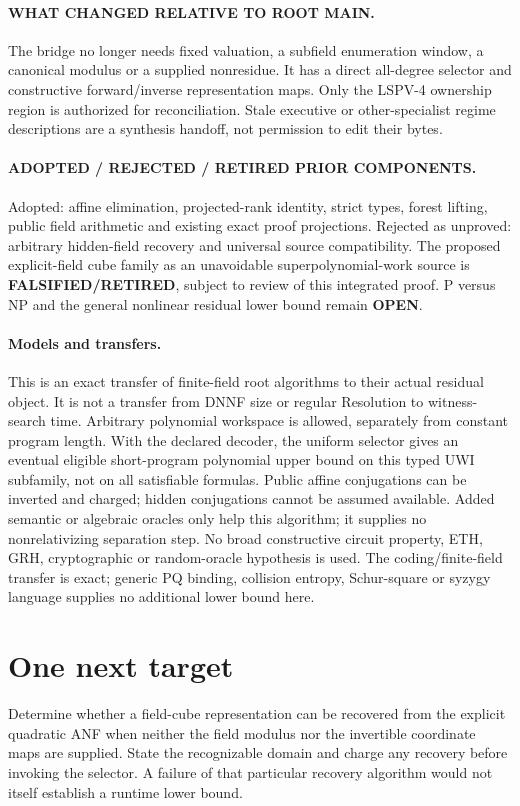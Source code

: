 \documentclass[11pt]{article}
\begin{document}
\paragraph{WHAT CHANGED RELATIVE TO ROOT MAIN.}
The bridge no longer needs fixed valuation, a subfield enumeration window,
a canonical modulus or a supplied nonresidue. It has a direct all-degree
selector and constructive forward/inverse representation maps. Only the
LSPV-4 ownership region is authorized for reconciliation. Stale executive or
other-specialist regime descriptions are a synthesis handoff, not permission
to edit their bytes.

\paragraph{ADOPTED / REJECTED / RETIRED PRIOR COMPONENTS.}
Adopted: affine elimination, projected-rank identity, strict types, forest
lifting, public field arithmetic and existing exact proof projections.
Rejected as unproved: arbitrary hidden-field recovery and universal source
compatibility. The proposed explicit-field cube family as an unavoidable
superpolynomial-work source is \textbf{FALSIFIED/RETIRED}, subject to review
of this integrated proof. P versus NP and the general nonlinear residual
lower bound remain \textbf{OPEN}.

\paragraph{Models and transfers.}
This is an exact transfer of finite-field root algorithms to their actual
residual object. It is not a transfer from DNNF size or regular Resolution
\cite{colnet} to witness-search time. Arbitrary polynomial workspace is
allowed, separately from constant program length. With the declared decoder,
the uniform selector gives an eventual eligible short-program polynomial
upper bound on this typed UWI subfamily, not on all satisfiable formulas.
Public affine conjugations can be inverted and charged; hidden conjugations
cannot be assumed available. Added semantic or algebraic oracles only help
this algorithm; it supplies no nonrelativizing separation step. No broad
constructive circuit property, ETH, GRH, cryptographic or random-oracle
hypothesis is used. The coding/finite-field transfer is exact; generic PQ
binding, collision entropy, Schur-square or syzygy language supplies no
additional lower bound here.

\section{One next target}
Determine whether a field-cube representation can be recovered from the
explicit quadratic ANF when neither the field modulus nor the invertible
coordinate maps are supplied. State the recognizable domain and charge any
recovery before invoking the selector. A failure of that particular recovery
algorithm would not itself establish a runtime lower bound.
\end{document}
